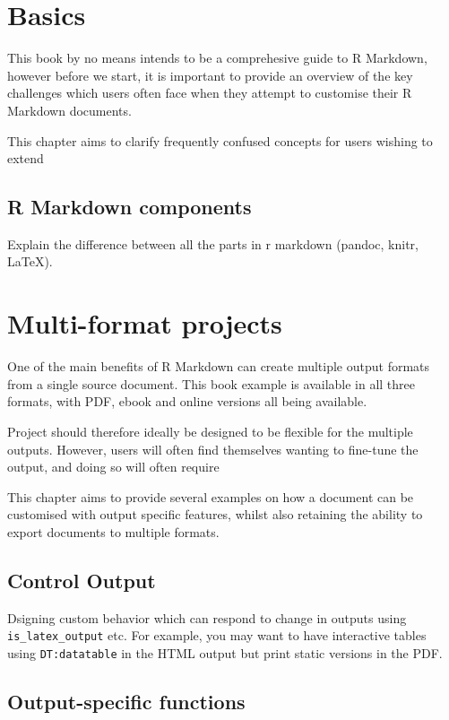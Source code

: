 \documentclass[]{book}
\begin{document}
\chapter{Basics}\label{basics}

This book by no means intends to be a comprehesive guide to R Markdown,
however before we start, it is important to provide an overview of the
key challenges which users often face when they attempt to customise
their R Markdown documents.

This chapter aims to clarify frequently confused concepts for users
wishing to extend

\section{R Markdown components}\label{r-markdown-components}

Explain the difference between all the parts in r markdown (pandoc,
knitr, LaTeX).

\chapter{Multi-format projects}\label{multi-format-projects}

One of the main benefits of R Markdown can create multiple output
formats from a single source document. This book example is available in
all three formats, with PDF, ebook and online versions all being
available.

Project should therefore ideally be designed to be flexible for the
multiple outputs. However, users will often find themselves wanting to
fine-tune the output, and doing so will often require

This chapter aims to provide several examples on how a document can be
customised with output specific features, whilst also retaining the
ability to export documents to multiple formats.

\section{Control Output}\label{control-output}

Dsigning custom behavior which can respond to change in outputs using
\texttt{is\_latex\_output} etc. For example, you may want to have
interactive tables using \texttt{DT:datatable} in the HTML output but
print static versions in the PDF.

\section{Output-specific functions}\label{output-specific-functions}
\end{document}
